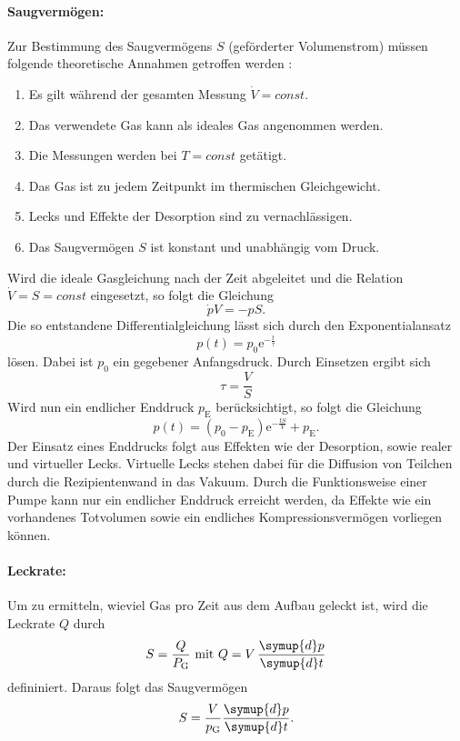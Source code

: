 \paragraph{Saugvermögen:}
Zur Bestimmung des Saugvermögens $S$ (geförderter Volumenstrom) müssen folgende theoretische Annahmen getroffen werden \cite{anleitung}:
\begin{enumerate}
 \item Es gilt während der gesamten Messung $\dot{V} = const$.
 \item Das verwendete Gas kann als ideales Gas angenommen werden.
 \item Die Messungen werden bei $T = const$ getätigt.
 \item Das Gas ist zu jedem Zeitpunkt im thermischen Gleichgewicht.
 \item Lecks und Effekte der Desorption sind zu vernachlässigen.
 \item Das Saugvermögen $S$ ist konstant und unabhängig vom Druck.
\end{enumerate}
Wird die ideale Gasgleichung nach der Zeit abgeleitet und die Relation $\dot{V} = S = const$ eingesetzt,
so folgt die Gleichung
\begin{equation}
  \dot{p}V = -pS.
\end{equation}
Die so entstandene Differentialgleichung lässt sich durch den Exponentialansatz
\begin{equation}
  p(t) = p_0 \text{e}^{-\frac{t}{\tau}}
\end{equation}
lösen. Dabei ist $p_0$ ein gegebener Anfangsdruck. Durch Einsetzen ergibt sich
\begin{equation}
  \tau = \frac{V}{S}
\end{equation}
Wird nun ein endlicher Enddruck $p_\text{E}$ berücksichtigt, so folgt die Gleichung
\begin{equation}
  p(t) = (p_0 - p_\text{E})\text{e}^{-\frac{tS}{V}}+p_\text{E}.
  \label{eqn:druck}
\end{equation}
Der Einsatz eines Enddrucks folgt aus Effekten wie der Desorption,
sowie realer und virtueller Lecks.
Virtuelle Lecks stehen dabei für die Diffusion von Teilchen durch die
Rezipientenwand in das Vakuum.
Durch die Funktionsweise einer Pumpe kann nur ein endlicher Enddruck erreicht werden,
da Effekte wie ein vorhandenes
Totvolumen sowie ein endliches Kompressionsvermögen vorliegen können.

\paragraph{Leckrate:}
Um zu ermitteln, wieviel Gas pro Zeit aus dem Aufbau geleckt ist, wird die Leckrate $Q$ durch
\begin{equation}
  S  = \frac{Q}{P_\text{G}} \text{ mit } Q = V\,\frac{\symup{d} p}{\symup{d} t}
\end{equation}
defininiert. Daraus folgt das Saugvermögen
\begin{equation}
  S = \frac{V}{p_\text{G}}\frac{\symup{d} p}{\symup{d} t}.
  \label{eqn:Saug}
\end{equation}

